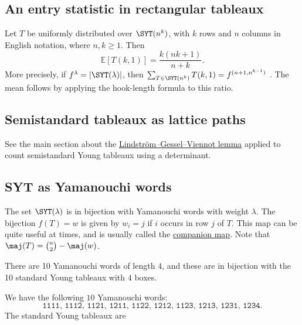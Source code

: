 \subsection[rectangularTableauMean]{An entry statistic in rectangular tableaux}

Let $T$ be uniformly distributed over $\SYT(n^k)$, with $k$ rows and
$n$ columns in English notation, where $n,k\geq1$. Then
\[
 \mathbb{E}[T(k,1)]=\frac{k(nk+1)}{n+k}.
\]
More precisely, if $f^\lambda=|\SYT(\lambda)|$, then
$\sum_{T\in\SYT(n^k)}T(k,1)=f^{(n+1,n^{k-1})}$
\cite[Cor.~5.6]{PanQiuWangWang2026x}.
The mean follows by applying the hook-length formula to this ratio.

\subsection[ssytAsLatticePaths]{Semistandard tableaux as lattice paths}

See the main section about the \hyperref[LGVssyt]{Lindström--Gessel--Viennot lemma}
applied to count semistandard Young tableaux using a determinant.


\subsection[prelimTableauxSmartMap]{SYT as Yamanouchi words}


The set $\SYT(\lambda)$ is in bijection with Yamanouchi words with weight $\lambda$.
The bijection $f(T)=w$ is given by $w_i = j$ if $i$ occurs in row $j$ of $T$.
This map can be quite useful at times, and is usually called the \hyperref[companionMap]{companion map}.
Note that $\maj(T) = \binom{n}{2}-\maj(w)$.

There are 10 Yamanouchi words of length $4$, and these are in 
bijection with the 10 standard Young tableaux with $4$ boxes.
\begin{example}
We have the following $10$ Yamanouchi words:
\[
\mathtt{1111},\,
\mathtt{1112},\,
\mathtt{1121},\,
\mathtt{1211},\,
\mathtt{1122},\,
\mathtt{1212},\,
\mathtt{1123},\,
\mathtt{1213},\,
\mathtt{1231},\,
\mathtt{1234}.
\]
The standard Young tableaux are
\begin{figure}
\end{figure}
\end{example}


